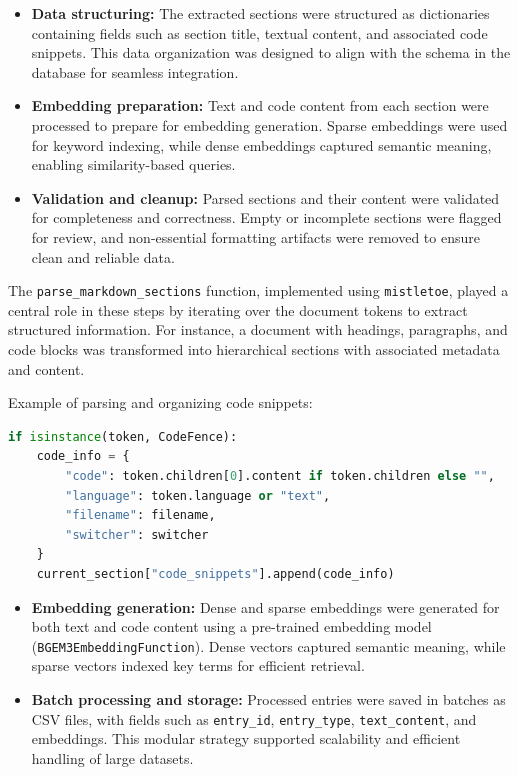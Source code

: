 \begin{itemize}
	\item \textbf{Data structuring:} 
	The extracted sections were structured as dictionaries containing fields such as section title, textual content, and associated code snippets. This data organization was designed to align with the schema in the database for seamless integration.
	
	\item \textbf{Embedding preparation:} 
	Text and code content from each section were processed to prepare for embedding generation. Sparse embeddings were used for keyword indexing, while dense embeddings captured semantic meaning, enabling similarity-based queries.
	
	\item \textbf{Validation and cleanup:} 
	Parsed sections and their content were validated for completeness and correctness. Empty or incomplete sections were flagged for review, and non-essential formatting artifacts were removed to ensure clean and reliable data.
\end{itemize}

The \texttt{parse\_markdown\_sections} function, implemented using \texttt{mistletoe}, played a central role in these steps by iterating over the document tokens to extract structured information. For instance, a document with headings, paragraphs, and code blocks was transformed into hierarchical sections with associated metadata and content.

Example of parsing and organizing code snippets:
\begin{lstlisting}[language=Python, caption=Code Snippet Parsing]
	if isinstance(token, CodeFence):
	code_info = {
		"code": token.children[0].content if token.children else "",
		"language": token.language or "text",
		"filename": filename,
		"switcher": switcher
	}
	current_section["code_snippets"].append(code_info)
\end{lstlisting}

\begin{itemize}
	\item \textbf{Embedding generation:} 
	Dense and sparse embeddings were generated for both text and code content using a pre-trained embedding model (\texttt{BGEM3EmbeddingFunction}). Dense vectors captured semantic meaning, while sparse vectors indexed key terms for efficient retrieval.
	
	\item \textbf{Batch processing and storage:} 
	Processed entries were saved in batches as CSV files, with fields such as \texttt{entry\_id}, \texttt{entry\_type}, \texttt{text\_content}, and embeddings. This modular strategy supported scalability and efficient handling of large datasets.
\end{itemize}

